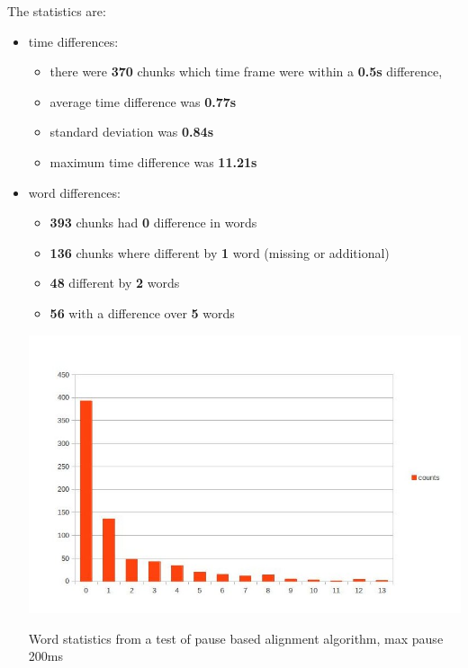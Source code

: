 \documentclass[12pt,a4paper,english]{article}
\begin{document}
The statistics are:
\begin{itemize}
    \item time differences: \newline
    \begin{itemize}
        \item there were \textbf{370} chunks which time frame were within a \textbf{0.5s} difference, 
        \item average time difference was \textbf{0.77s}
        \item standard deviation was \textbf{0.84s}
        \item maximum time difference was \textbf{11.21s}
    \end{itemize}
    \item word differences:
    \begin{itemize}
        \item \textbf{393} chunks had \textbf{0} difference in words
        \item \textbf{136} chunks where different by \textbf{1} word (missing or additional)
        \item \textbf{48} different by \textbf{2} words
        \item \textbf{56} with a difference over \textbf{5} words
    \end{itemize}
    \begin{center}
        \includegraphics[scale=0.6]{length_based_results_better.jpg}
        \caption[]{Word statistics from a test of pause based alignment algorithm, max pause 200ms}
    \end {center}
\end{itemize}
\end{document}
